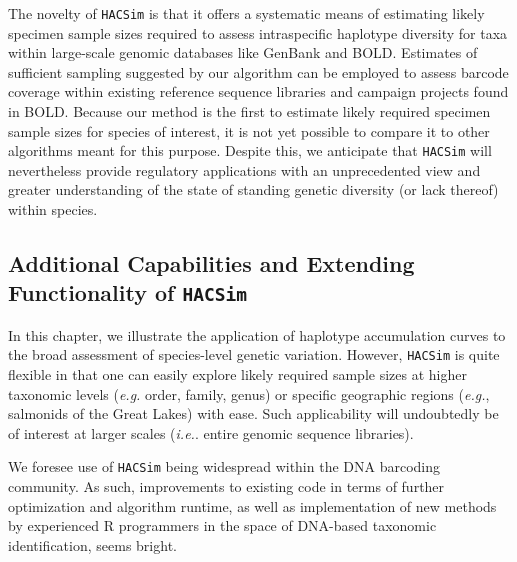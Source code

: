 The novelty of {\tt HACSim} is that it offers a systematic means of estimating likely \\ specimen sample sizes required to assess intraspecific haplotype diversity for taxa within large-scale genomic databases like GenBank and BOLD. Estimates of sufficient sampling suggested by our algorithm can be employed to assess barcode coverage within existing reference sequence libraries and campaign projects found in BOLD. Because  our method is the first to estimate likely required specimen sample sizes for species of interest, it is not yet possible to compare it to other algorithms meant for this purpose. Despite this, we anticipate that {\tt HACSim} will nevertheless provide regulatory applications with an unprecedented view and greater understanding of the state of standing genetic diversity (or lack thereof) within species.    



\subsection{Additional Capabilities and Extending Functionality of \tt{HACSim}}

In this chapter, we illustrate the application of haplotype accumulation curves to the broad assessment of species-level genetic variation. However, {\tt HACSim} is quite flexible in that one can easily explore likely required sample sizes at higher taxonomic levels (\textit{e.g.} order, family, genus) or specific geographic regions (\textit{e.g.}, salmonids of the Great Lakes) with ease. Such applicability will undoubtedly be of interest at larger scales (\textit{i.e.}. entire genomic sequence libraries). 



We foresee use of {\tt HACSim} being widespread within the DNA barcoding community. As such, improvements to existing code in terms of further optimization and algorithm runtime, as well as implementation of new methods by experienced R programmers in the space of DNA-based taxonomic identification, seems bright.



